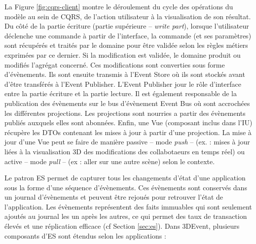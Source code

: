 La Figure \ref{fig:cqrs-client} montre le déroulement du cycle des opérations du 
modèle au sein de \gls{CQRS}, de l'action utilisateur à la visualisation de son 
résultat. 
Du côté de la partie écriture (partie supérieure -- \textit{write part}), lorsque 
l'utilisateur déclenche une commande à partir de l'interface, la commande (et ses 
paramètres) sont récupérés et traités par le domaine pour être validée selon les 
règles métiers exprimées par ce dernier. Si la modification est validée, le domaine 
produit ou modifiés l'agrégat concerné. Ces modifications sont converties sous 
forme d'évènements. Ils sont ensuite transmis à l'Event Store où ils sont stockés 
avant d'être transférés à l'Event Publisher. L'Event Publisher jour le rôle d'interface 
entre la partie écriture et la partie lecture. Il est également responsable de la 
publication des évènements sur le bus d'évènement Event Bus où sont 
accrochées les différentes projections. Les projections sont nourries a partir des 
évènements publiés auxquels elles sont abonnées. Enfin, une Vue (composant
inclus dans l'\gls{IU}) récupère les \glspl{DTO}
contenant les mises à jour à partir d'une projection. La mise à jour d'une Vue peut 
se faire de manière passive -- mode \textit{push} -- (ex. : mises à jour liées à la 
visualisation 3D des modifications des collabotaeurs en temps réel) ou active -- 
mode \textit{pull} -- (ex : aller sur une autre scène) selon le contexte.


Le patron \gls{ES} permet de capturer tous les changements d'état 
d'une application sous la forme d'une séquence d'évènements. 
Ces évènements sont conservés dans un journal d'évènements et peuvent être 
rejoués pour retrouver l'état de l'application. 
Les évènements représentent des faits immuables qui sont 
seulement ajoutés au journal les un après les autres, ce qui permet des taux de 
transaction élevés et une réplication efficace (cf Section 
\ref{sec:es}). Dans 3DEvent, plusieurs composants d'\gls{ES} sont étendus selon 
les applications :

